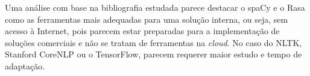 
%
% 

Uma análise com base na bibliografia estudada parece destacar o spaCy e o Rasa como as ferramentas mais adequadas para uma solução interna, ou seja, sem acesso à Internet, pois parecem estar preparadas para a implementação de soluções comerciais e não se tratam de ferramentas na \textit{cloud}. No caso do NLTK, Stanford CoreNLP ou o TensorFlow, parecem requerer maior estudo e tempo de adaptação.

